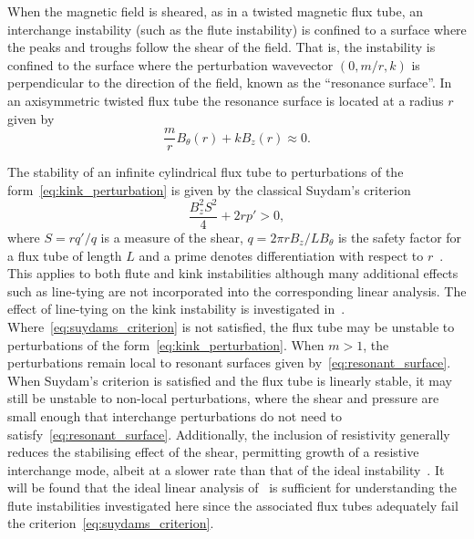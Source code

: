 \documentclass[fleqn,usenatbib]{mnras}
\begin{document}
When the magnetic field is sheared, as in a twisted magnetic flux tube, an
interchange instability (such as the flute instability) is confined to
a surface where the peaks and troughs follow the shear of the field. That is,
the instability is confined to the surface where the perturbation wavevector
$(0, m/r, k)$ is perpendicular to the direction of the field, known as the
``resonance surface''. In an axisymmetric twisted flux tube the resonance
surface is located at a radius $r$ given by
\begin{equation}
  \label{eq:resonant_surface}
\frac{m}{r} B_{\theta}(r) + kB_z(r) \approx 0.
\end{equation}

The stability of an infinite cylindrical flux tube to perturbations of the
form~\eqref{eq:kink_perturbation} is given by the classical Suydam's
criterion~\citep{suydamStabilityLinearPinch1958}
\begin{equation}
  \label{eq:suydams_criterion}
\frac{B_z^2 S^2}{4} + 2 r p' > 0,
\end{equation}
where $S = r q'/q$ is a measure of the shear, $q = 2\pi r B_z / L B_{\theta}$
is the safety factor for a flux tube of length $L$ and a prime denotes
differentiation with respect to
$r$~\citep{mikhailovskiiInstabilitiesConfinedPlasma1998}. This applies to both
flute and kink instabilities although many additional effects such as
line-tying are not incorporated into the corresponding linear analysis. The
effect of line-tying on the kink instability is investigated
in~\citet{hoodKinkInstabilitySolar1979}. Where~\eqref{eq:suydams_criterion} is
not satisfied, the flux tube may be unstable to perturbations of the
form~\eqref{eq:kink_perturbation}. When $m>1$, the perturbations remain local
to resonant surfaces given by~\eqref{eq:resonant_surface}. When Suydam's
criterion is satisfied and the flux tube is linearly stable, it may still be
unstable to non-local perturbations, where the shear and pressure are small
enough that interchange perturbations do not need to
satisfy~\eqref{eq:resonant_surface}. Additionally, the inclusion of resistivity
generally reduces the stabilising effect of the shear, permitting growth of
a resistive interchange mode, albeit at a slower rate than that of the ideal
instability~\citep{mikhailovskiiInstabilitiesConfinedPlasma1998}. It will be
found that the ideal linear analysis
of~\cite{mikhailovskiiInstabilitiesConfinedPlasma1998} is sufficient for
understanding the flute instabilities investigated here since the associated
flux tubes adequately fail the criterion~\eqref{eq:suydams_criterion}.
\end{document}
